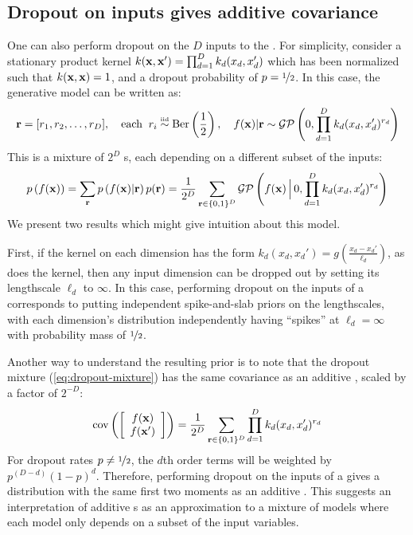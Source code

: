 \subsection{Dropout on inputs gives additive covariance}
One can also perform dropout on the $D$ inputs to the \gp{}.
For simplicity, consider a stationary product kernel ${k({\bf{x}}, {\bf{x}}') = \prod_{d=1}^D k_d(x_d, x_d')}$ which has been normalized such that $k({\bf{x}}, {\bf{x}}) = 1$, and a dropout probability of $p = \nicefrac{1}{2}$.
In this case, the generative model can be written as:
%
\begin{align}
{\bf{r}} = [r_1, r_2, \dots, r_D], \quad \textnormal{each} \;\; r_i \overset{\mbox{\tiny iid}}{\sim} \textnormal{Ber} \left( \frac{1}{2} \right), \quad f({\bf{x}}) | {\bf{r}} \sim \mathcal{GP} \left( 0, \prod_{d=1}^D k_d(x_d, x_d')^{r_d} \right)
\end{align}
%
This is a mixture of $2^D$ \gp{}s, each depending on a different subset of the inputs:
%
\begin{align}
p \left( f({\bf{x}}) \right) = 
\sum_{{\bf{r}}} p \left( f({\bf{x}}) | {\bf{r}} \right) p( {\bf{r}}) = 
\frac{1}{2^D} \sum_{{\bf{r}} \in \{0,1\}^D}  \mathcal{GP} \left(f({\bf{x}}) \,\Big|\, 0, \prod_{d=1}^D k_d(x_d, x_d')^{r_d} \right)
\label{eq:dropout-mixture}
\end{align}
We present two results which might give intuition about this model.

First, if the kernel on each dimension has the form ${k_d(x_d, x_d') = g \left( \frac{x_d - x_d'}{\ell_d} \right)}$, as does the \kSE{} kernel, then any input dimension can be dropped out by setting its lengthscale $\ell_d$ to $\infty$.
In this case, performing dropout on the inputs of a \gp{} corresponds to putting independent spike-and-slab priors on the lengthscales, with each dimension's distribution independently having ``spikes'' at $\ell_d = \infty$ with probability mass of $\nicefrac{1}{2}$.



Another way to understand the resulting prior is to note that the dropout mixture (\cref{eq:dropout-mixture}) has the same covariance as an additive \gp{}, scaled by a factor of $2^{-D}$:
\begin{align}
\operatorname{cov}\left( \left[ \begin{array}{c} {f({\bf{x}})} \\ {f({\bf{x}}')} \end{array} \right] \right) = \frac{1}{2^{D}} \sum_{{\bf{r}} \in \{0,1\}^D}  \prod_{d=1}^D k_d(x_d, x_d')^{r_d}
\label{eq:dropout-mixture-covariance}
\end{align}
%
For dropout rates $p \neq \nicefrac{1}{2}$, the $d$th order terms will be weighted by $p^{(D - d)}(1-p)^d$.
Therefore, performing dropout on the inputs of a \gp{} gives a distribution with the same first two moments as an additive \gp{}.
This suggests an interpretation of additive \gp{}s as an approximation to a mixture of models where each model only depends on a subset of the input variables.







